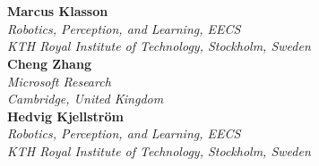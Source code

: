 




\chapter{
}
\vspace{-1cm}
\large{\textbf{Marcus Klasson}} \\
\large{\textit{Robotics, Perception, and Learning, EECS}} \\
\large{\textit{KTH Royal Institute of Technology, Stockholm, Sweden}} \\

\noindent\large{\textbf{Cheng Zhang}} \\
\large{\textit{Microsoft Research}} \\
\large{\textit{Cambridge, United Kingdom}} \\

\noindent\large{\textbf{Hedvig Kjellstr\"{o}m}} \\
\large{\textit{Robotics, Perception, and Learning, EECS}} \\
\large{\textit{KTH Royal Institute of Technology, Stockholm, Sweden}} 
\vspace{5pt}


